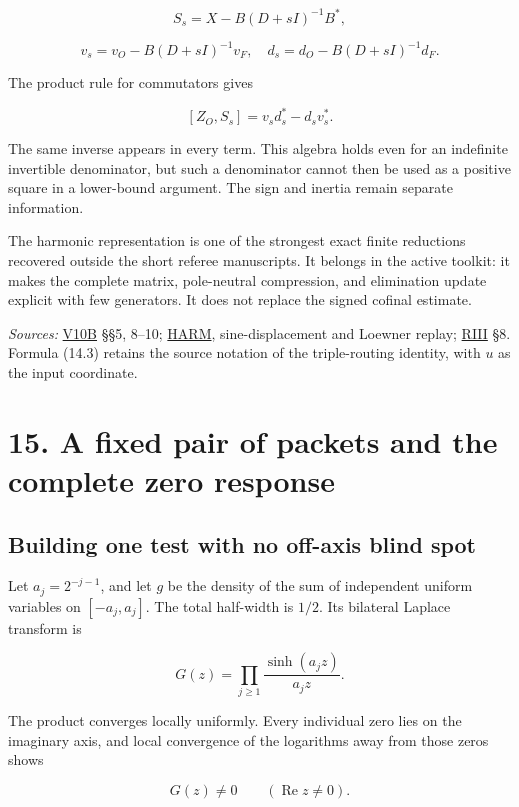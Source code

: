 \documentclass[
  10pt,
  a4paper,
  10pt,
  oneside,
  openany]{book}
\begin{document}
\[
S_s=X-B(D+sI)^{-1}B^*,
\tag{14.16}\label{eq:14.16}
\]

\[
v_s=v_O-B(D+sI)^{-1}v_F,
\quad d_s=d_O-B(D+sI)^{-1}d_F.
\tag{14.17}\label{eq:14.17}
\]

The product rule for commutators gives

\[
[Z_O,S_s]=v_sd_s^*-d_sv_s^*.
\tag{14.18}\label{eq:14.18}
\]

The same inverse appears in every term. This algebra holds even for an
indefinite invertible denominator, but such a denominator cannot then be
used as a positive square in a lower-bound argument. The sign and
inertia remain separate information.

The harmonic representation is one of the strongest exact finite
reductions recovered outside the short referee manuscripts. It belongs
in the active toolkit: it makes the complete matrix, pole-neutral
compression, and elimination update explicit with few generators. It
does not replace the signed cofinal estimate.

\emph{Sources:} \hyperref[source-v10b]{V10B} §§5, 8--10;
\hyperref[source-harm]{HARM}, sine-displacement and Loewner replay;
\hyperref[source-riii]{RIII} §8. Formula (14.3) retains the source
notation of the triple-routing identity, with \(u\) as the input
coordinate.

\section{15. A fixed pair of packets and the complete zero
response}\label{ch-packets}

\subsection{Building one test with no off-axis blind
spot}\label{building-one-test-with-no-off-axis-blind-spot}

Let \(a_j=2^{-j-1}\), and let \(g\) be the density of the sum of
independent uniform variables on \([-a_j,a_j]\). The total half-width is
\(1/2\). Its bilateral Laplace transform is

\[
G(z)=\prod_{j\ge1}\frac{\sinh(a_jz)}{a_jz}.
\tag{15.1}\label{eq:15.1}
\]

The product converges locally uniformly. Every individual zero lies on
the imaginary axis, and local convergence of the logarithms away from
those zeros shows

\[
G(z)\ne0\qquad(\operatorname{Re}z\ne0).
\tag{15.2}\label{eq:15.2}
\]
\end{document}
